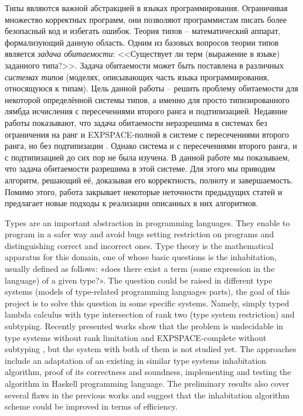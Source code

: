 \documentclass[../main.tex]{subfiles}
\begin{document}
Типы являются важной абстракцией в языках программирования. Ограничивая множество корректных программ, они позволяют программистам писать более безопасный код и избегать ошибок. Теория типов -- математический аппарат, формализующий данную область. Одним из базовых вопросов теории типов является {\it задача обитаемости}: <<Существует ли терм (выражение в языке) заданного типа?>>. Задача обитаемости может быть поставлена в различных {\it системах типов} (моделях, описывающих часть языка программирования, относящуюся к типам). Цель данной работы -- решить проблему обитаемости для некоторой определённой системы типов, а именно для просто типизированного лямбда исчисления с пересечениями второго ранга и подтипизацией. Недавние работы показывают, что задача обитаемости неразрешима в системах без ограничения на ранг \cite{urzyczyn_97} и EXPSPACE-полной в системе с пересечениями второго ранга, но без подтипизации \cite{kusmierek_07, urzyczyn_09}. Однако система и с пересечениями второго ранга, и с подтипизацией до сих пор не была изучена. В данной работе мы показываем, что задача обитаемости разрешима в этой системе. Для этого мы приводим алгоритм, решающий её, доказывая его корректность, полноту и завершаемость. Помимо этого, работа закрывает некоторые неточности предыдущих статей и предлагает новые подходы к реализации описанных в них алгоритмов.

\newpage

Types are an important abstraction in programming languages. They enable to program in a safer way and avoid bugs setting restriction on programs and distinguishing correct and incorrect ones. Type theory is the mathematical apparatus for this domain, one of whose basic questions is the inhabitation, usually defined as follows: «does there exist a term (some expression in the language) of a given type?». The question could be raised in different type systems (models of type-related programming languages parts), the goal of this project is to solve this question in some specific systems. Namely, simply typed lambda calculus with type intersection of rank two (type system restriction) and subtyping. Recently presented works show that the problem is undecidable in type systems without rank limitation \cite{urzyczyn_97} and EXPSPACE-complete without subtyping \cite{kusmierek_07, urzyczyn_09}, but the system with both of them is not studied yet. The approaches include an adaptation of an existing in similar type systems inhabitation algorithm, proof of its correctness and soundness, implementing and testing the algorithm in Haskell programming language. The preliminary results also cover several flaws in the previous works and suggest that the inhabitation algorithm scheme could be improved in terms of efficiency.
\end{document}
